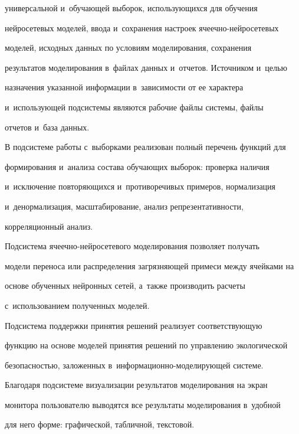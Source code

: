 универсальной и~обучающей выборок, использующихся для обучения 


нейросетевых моделей, ввода и~сохранения настроек яче\-еч\-но-ней\-ро\-се\-те\-вых 


моделей, исходных данных по условиям моделирования, сохранения 


результатов моделирования в~файлах данных и~отчетов. Источником и~целью 


назначения указанной информации в~зависимости от ее характера 


и~использующей подсистемы являются рабочие файлы системы, файлы 


отчетов и~база данных.


  


  В подсистеме работы с~выборками реализован полный перечень функций для 


формирования и~анализа состава обучающих выборок: проверка наличия 


и~исключение повторяющихся и~противоречивых примеров, нормализация 


и~денормализация, масштабирование, анализ репрезентативности, 


корреляционный анализ.


  


  Подсистема ячеечно-нейросетевого моделирования позволяет получать 


модели переноса или распределения загрязняющей примеси между ячейками на 


основе обученных нейронных сетей, а~также производить расчеты 


с~использованием полученных моделей.


  


  Подсистема поддержки принятия решений реализует соответствующую 


функцию на основе моделей принятия решений по управлению экологической 


без\-опас\-ностью, заложенных в~ин\-фор\-ма\-ци\-он\-но-мо\-де\-ли\-ру\-ющей сис\-теме.


  


  Благодаря подсистеме визуализации результатов моделирования на экран 


монитора пользователю выводятся все результаты моделирования в~удобной 


для него форме: графической, табличной, текстовой.


